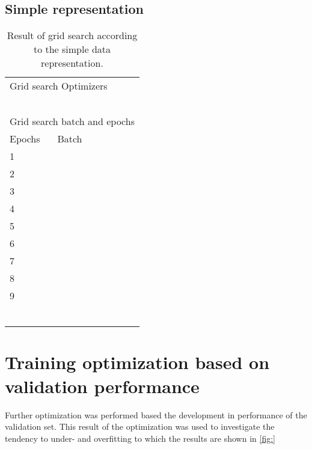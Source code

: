 \subsection{Simple representation}
\begin{table}[H]
\centering
\label{tab:gridResults}
\begin{tabular}{llllll}
\multicolumn{6}{l}{Grid search Optimizers}       \\
           &           &      &      &     &     \\
           &           &      &      &     &     \\
           &           &      &      &     &     \\
           &           &      &      &     &     \\
           &           &      &      &     &     \\
\multicolumn{6}{l}{Grid search batch and epochs} \\
Epochs     & Batch     &      &      &     &     \\
1          &           &      &      &     &     \\
2          &           &      &      &     &     \\
3          &           &      &      &     &     \\
4          &           &      &      &     &     \\
5          &           &      &      &     &     \\
6          &           &      &      &     &     \\
7          &           &      &      &     &     \\
8          &           &      &      &     &     \\
9          &           &      &      &     &     \\
\multicolumn{6}{l}{}                             \\
           &           &      &      &     &     \\
           &           &      &      &     &     \\
           &           &      &      &     &     \\
           &           &      &      &     &     \\
           &           &      &      &     &     
           
\end{tabular}
\caption{Result of grid search according to the simple data representation.}
\end{table}

\section{Training optimization based on validation performance}
Further optimization was performed based the development in performance of the validation set. This result of the optimization was used to investigate the tendency to under- and overfitting to which the results are shown in \autoref{fig:}
